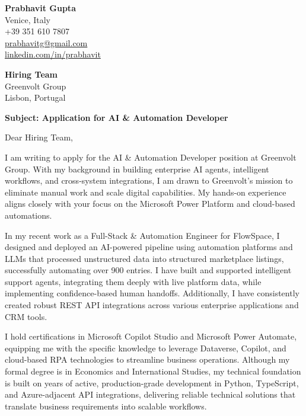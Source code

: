 \documentclass[11pt,a4paper]{letter}
\begin{document}
\begin{flushleft}
\textbf{Prabhavit Gupta}\\
Venice, Italy\\
+39 351 610 7807\\
\href{mailto:prabhavitg@gmail.com}{prabhavitg@gmail.com}\\
\href{https://www.linkedin.com/in/prabhavit/}{linkedin.com/in/prabhavit}
\end{flushleft}

\vspace{2em}

\begin{flushleft}
\textbf{Hiring Team}\\
Greenvolt Group\\
Lisbon, Portugal
\end{flushleft}

\vspace{1em}

\textbf{Subject: Application for AI \& Automation Developer}

\vspace{1em}

Dear Hiring Team,

I am writing to apply for the AI \& Automation Developer position at Greenvolt Group. With my background in building enterprise AI agents, intelligent workflows, and cross-system integrations, I am drawn to Greenvolt's mission to eliminate manual work and scale digital capabilities. My hands-on experience aligns closely with your focus on the Microsoft Power Platform and cloud-based automations.

In my recent work as a Full-Stack \& Automation Engineer for FlowSpace, I designed and deployed an AI-powered pipeline using automation platforms and LLMs that processed unstructured data into structured marketplace listings, successfully automating over 900 entries. I have built and supported intelligent support agents, integrating them deeply with live platform data, while implementing confidence-based human handoffs. Additionally, I have consistently created robust REST API integrations across various enterprise applications and CRM tools.

I hold certifications in Microsoft Copilot Studio and Microsoft Power Automate, equipping me with the specific knowledge to leverage Dataverse, Copilot, and cloud-based RPA technologies to streamline business operations. Although my formal degree is in Economics and International Studies, my technical foundation is built on years of active, production-grade development in Python, TypeScript, and Azure-adjacent API integrations, delivering reliable technical solutions that translate business requirements into scalable workflows.
\end{document}
